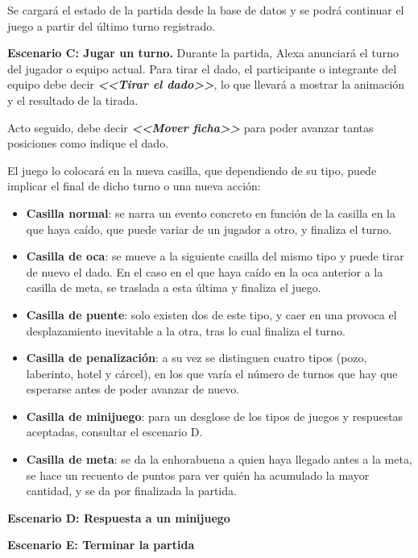 Se cargará el estado de la partida desde la base de datos y se podrá continuar el juego a partir del último turno registrado.

\vspace{1cm}
\textbf{Escenario C: Jugar un turno.}
Durante la partida, Alexa anunciará el turno del jugador o equipo actual.
Para tirar el dado, el participante o integrante del equipo debe decir \textbf{\textit{<<Tirar el dado>>}}, lo que llevará a mostrar la animación y el resultado de la tirada.

Acto seguido, debe decir \textbf{\textit{<<Mover ficha>>}} para poder avanzar tantas posiciones como indique el dado.

El juego lo colocará en la nueva casilla, que dependiendo de su tipo, puede implicar el final de dicho turno o una nueva acción:
 \begin{itemize}
 	\item \textbf{Casilla normal}: se narra un evento concreto en función de la casilla en la que haya caído, que puede variar de un jugador a otro, y finaliza el turno.
 	\item \textbf{Casilla de oca}: se mueve a la siguiente casilla del mismo tipo y puede tirar de nuevo el dado. En el caso en el que haya caído en la oca anterior a la casilla de meta, se traslada a esta última y finaliza el juego.
 	\item \textbf{Casilla de puente}: solo existen dos de este tipo, y caer en una provoca el desplazamiento inevitable a la otra, tras lo cual finaliza el turno. 
 	\item \textbf{Casilla de penalización}: a su vez se distinguen cuatro tipos (pozo, laberinto, hotel y cárcel), en los que varía el número de turnos que hay que esperarse antes de poder avanzar de nuevo.
 	\item \textbf{Casilla de minijuego}: para un desglose de los tipos de juegos y respuestas aceptadas, consultar el escenario D.
 	\item \textbf{Casilla de meta}: se da la enhorabuena a quien haya llegado antes a la meta, se hace un recuento de puntos para ver quién ha acumulado la mayor cantidad, y se da por finalizada la partida.
 \end{itemize}

\vspace{0.5cm}
\textbf{Escenario D: Respuesta a un minijuego}

\vspace{1cm}
\textbf{Escenario E: Terminar la partida}


